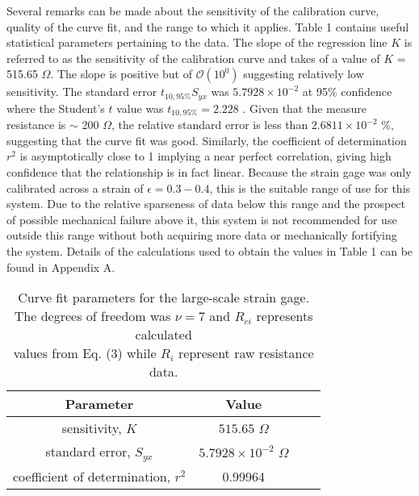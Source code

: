 \documentclass[12pt, letterpaper]{article}
\begin{document}
Several remarks can be made about the sensitivity of the calibration curve,
quality of the curve fit, and the range to which it applies. Table 1 contains
useful statistical parameters pertaining to the data. The slope of the
regression line $K$ is referred to as the sensitivity of the calibration curve
and takes of a value of $K$ = 515.65 $\Omega$. The slope is positive but of
$\mathcal{O}(10^0)$ suggesting relatively low sensitivity. The standard error
$t_{10,95\%} S_{yx}$ was $5.7928 \times 10^{-2}$ at 95\%  confidence where the
Student's $t$ value was $t_{10,95\%} = 2.228$ \cite{dunn}. Given that the measure
resistance is $\sim$ 200 $\Omega$, the relative standard error is less than
$2.6811 \times 10^{-2}$  \%, suggesting that the curve fit was good.  Similarly, the
coefficient of determination $r^2$ is asymptotically close to 1 implying a
near perfect correlation, giving high confidence that the relationship is in
fact linear.  Because the strain gage was only calibrated across a strain of
$\epsilon = 0.3 - 0.4$, this is the suitable range of use for this system. Due
to the relative sparseness of data below this range and the prospect of
possible mechanical failure above it, this system is not recommended for use
outside this range without both acquiring more data or mechanically fortifying
the system. Details of the calculations used to obtain the values in Table 1
can be found in Appendix A.

\begin{table}[h!]
\centering
   \caption{Curve fit parameters for the large-scale strain gage. \\
      The degrees of freedom was $\nu =7$ and $R_{ci}$ represents calculated \\
   values from Eq. (3) while $R_i$ represent raw resistance data.}
   \begin{tabular}{ c c c c } \toprule
      Parameter & Value \\ \midrule
      sensitivity, $K$ & $515.65$ ${\Omega}$ \\ \midrule
      standard error, $S_{yx}$  & $5.7928 \times 10^{-2}$ ${\Omega}$  \\  \midrule
     coefficient of determination,  $r^2$ & 0.99964 \\ \bottomrule
\end{tabular}
\label{table1}
\end{table}
\end{document}

